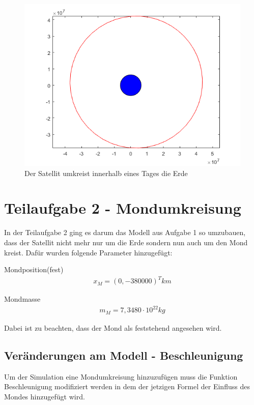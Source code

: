 \documentclass[]{scrartcl}
\begin{document}
\begin{figure}[H]
\centering
\includegraphics[width=1\linewidth]{./1_einTagKreisbahn}
\caption{Der Satellit umkreist innerhalb eines Tages die Erde}
\label{fig:1_einTagKreisbahn}
\end{figure}

\section{Teilaufgabe 2 - Mondumkreisung}
In der Teilaufgabe 2 ging es darum das Modell aus Aufgabe 1 so umzubauen, dass der Satellit nicht mehr nur um die Erde sondern nun auch um den Mond kreist. Dafür wurden folgende Parameter hinzugefügt:

Mondposition(fest)
\begin{align}
x_{M} = (0,-380000)^T km
\end{align}

Mondmasse
\begin{align}
m_{M} = 7,3480 \cdot 10^{22} kg
\end{align}

Dabei ist zu beachten, dass der Mond als feststehend angesehen wird.

\subsection{Veränderungen am Modell - Beschleunigung}
Um der Simulation eine Mondumkreisung hinzuzufügen muss die Funktion Beschleunigung modifiziert werden in dem der jetzigen Formel der Einfluss des Mondes hinzugefügt wird.
\end{document}
